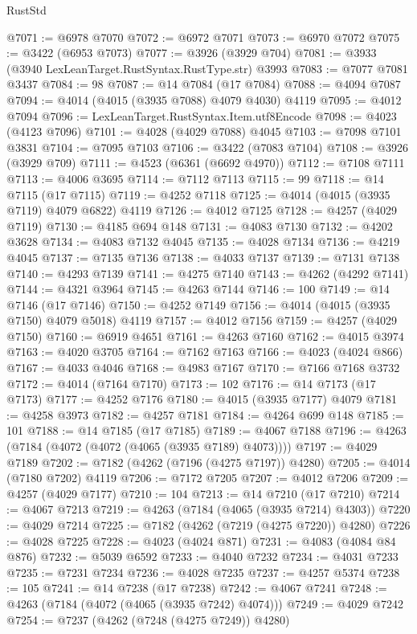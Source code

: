 \begin{lexlean}{RustStd}
\begin{coremodule}
@7071 := @6978 @7070
@7072 := @6972 @7071
@7073 := @6970 @7072
@7075 := @3422 (@6953 @7073)
@7077 := @3926 (@3929 @704)
@7081 := @3933 (@3940 LexLeanTarget.RustSyntax.RustType.str) @3993
@7083 := @7077 @7081 @3437
@7084 := 98
@7087 := @14 @7084 (@17 @7084)
@7088 := @4094 @7087
@7094 := @4014 (@4015 (@3935 @7088) @4079 @4030) @4119
@7095 := @4012 @7094
@7096 := LexLeanTarget.RustSyntax.Item.utf8Encode
@7098 := @4023 (@4123 @7096)
@7101 := @4028 (@4029 @7088) @4045
@7103 := @7098 @7101 @3831
@7104 := @7095 @7103
@7106 := @3422 (@7083 @7104)
@7108 := @3926 (@3929 @709)
@7111 := @4523 (@6361 (@6692 @4970))
@7112 := @7108 @7111
@7113 := @4006 @3695
@7114 := @7112 @7113
@7115 := 99
@7118 := @14 @7115 (@17 @7115)
@7119 := @4252 @7118
@7125 := @4014 (@4015 (@3935 @7119) @4079 @6822) @4119
@7126 := @4012 @7125
@7128 := @4257 (@4029 @7119)
@7130 := @4185 @694 @148
@7131 := @4083 @7130
@7132 := @4202 @3628
@7134 := @4083 @7132 @4045
@7135 := @4028 @7134
@7136 := @4219 @4045
@7137 := @7135 @7136
@7138 := @4033 @7137
@7139 := @7131 @7138
@7140 := @4293 @7139
@7141 := @4275 @7140
@7143 := @4262 (@4292 @7141)
@7144 := @4321 @3964
@7145 := @4263 @7144
@7146 := 100
@7149 := @14 @7146 (@17 @7146)
@7150 := @4252 @7149
@7156 := @4014 (@4015 (@3935 @7150) @4079 @5018) @4119
@7157 := @4012 @7156
@7159 := @4257 (@4029 @7150)
@7160 := @6919 @4651
@7161 := @4263 @7160
@7162 := @4015 @3974
@7163 := @4020 @3705
@7164 := @7162 @7163
@7166 := @4023 (@4024 @866)
@7167 := @4033 @4046
@7168 := @4983 @7167
@7170 := @7166 @7168 @3732
@7172 := @4014 (@7164 @7170)
@7173 := 102
@7176 := @14 @7173 (@17 @7173)
@7177 := @4252 @7176
@7180 := @4015 (@3935 @7177) @4079
@7181 := @4258 @3973
@7182 := @4257 @7181
@7184 := @4264 @699 @148
@7185 := 101
@7188 := @14 @7185 (@17 @7185)
@7189 := @4067 @7188
@7196 := @4263 (@7184 (@4072 (@4072 (@4065 (@3935 @7189) @4073))))
@7197 := @4029 @7189
@7202 := @7182 (@4262 (@7196 (@4275 @7197)) @4280)
@7205 := @4014 (@7180 @7202) @4119
@7206 := @7172 @7205
@7207 := @4012 @7206
@7209 := @4257 (@4029 @7177)
@7210 := 104
@7213 := @14 @7210 (@17 @7210)
@7214 := @4067 @7213
@7219 := @4263 (@7184 (@4065 (@3935 @7214) @4303))
@7220 := @4029 @7214
@7225 := @7182 (@4262 (@7219 (@4275 @7220)) @4280)
@7226 := @4028 @7225
@7228 := @4023 (@4024 @871)
@7231 := @4083 (@4084 @84 @876)
@7232 := @5039 @6592
@7233 := @4040 @7232
@7234 := @4031 @7233
@7235 := @7231 @7234
@7236 := @4028 @7235
@7237 := @4257 @5374
@7238 := 105
@7241 := @14 @7238 (@17 @7238)
@7242 := @4067 @7241
@7248 := @4263 (@7184 (@4072 (@4065 (@3935 @7242) @4074)))
@7249 := @4029 @7242
@7254 := @7237 (@4262 (@7248 (@4275 @7249)) @4280)

\end{coremodule}
\end{lexlean}
